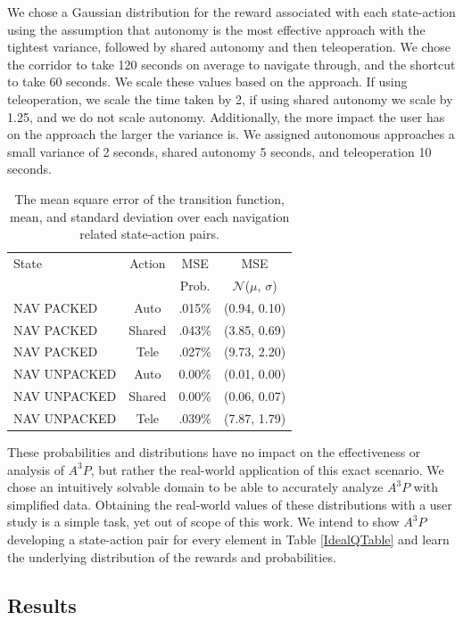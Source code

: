 \documentclass[letterpaper, 10 pt, conference]{ieeeconf}  %
\begin{document}
We chose a Gaussian distribution for the reward associated with each state-action using the assumption that autonomy is the most effective approach with the tightest variance, followed by shared autonomy and then teleoperation. We chose the corridor to take 120 seconds on average to navigate through, and the shortcut to take 60 seconds. We scale these values based on the approach. If using teleoperation, we scale the time taken by 2, if using shared autonomy we scale by 1.25, and we do not scale autonomy. Additionally, the more impact the user has on the approach the larger the variance is. We assigned autonomous approaches a small variance of 2 seconds, shared autonomy 5 seconds, and teleoperation 10 seconds.

\begin{table}
\centering
\begin{tabular}{|l|c|c|c|}
\hline
State & Action & MSE  & MSE  \\
 &  &  Prob. & $\mathcal{N}$($\mu$, $\sigma$) \\
\hline
NAV PACKED & Auto & .015\% & (0.94, 0.10)\\
\hline
NAV PACKED & Shared & .043\% & (3.85, 0.69)\\
\hline
NAV PACKED & Tele & .027\% & (9.73, 2.20)\\
\hline
NAV UNPACKED & Auto & 0.00\% & (0.01, 0.00) \\
\hline
NAV UNPACKED & Shared & 0.00\% & (0.06, 0.07) \\
\hline
NAV UNPACKED & Tele & .039\% & (7.87, 1.79)\\
\hline
\end{tabular}
\caption{The mean square error of the transition function, mean, and standard deviation over each navigation related state-action pairs.}
\label{LearnedQTable}
\end{table}

These probabilities and distributions have no impact on the effectiveness or analysis of $A^3P$, but rather the real-world application of this exact scenario. We chose an intuitively solvable domain to be able to accurately analyze $A^3P$ with simplified data. Obtaining the real-world values of these distributions with a user study is a simple task, yet out of scope of this work. We intend to show $A^3P$ developing a state-action pair for every element in Table \ref{IdealQTable} and learn the underlying distribution of the rewards and probabilities.  

\subsection{Results}
\end{document}
